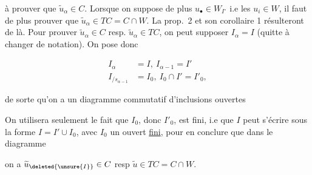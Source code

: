 
à prouver que $\widetilde u_\alpha\in C$. Lorsque on suppose de plus $u_\bullet\in W_{I^\circ}$ i.e les $u_i\in W$, il faut de plus prouver que $\widetilde u_\alpha\in TC=C\cap W$. La prop.~2 et son corollaire 1 résulteront de là. Pour prouver $\widetilde u_\alpha\in C$  resp. $\widetilde u_\alpha\in TC$, on  peut supposer $I_\alpha=I$ (quitte à changer de notation). On pose donc

\[
\begin{aligned}
 I_\alpha&=I,\ I_{\alpha-1}=I'\\
 I_{/s_{\alpha-1}}&=I_0,\ I_0\cap I'=I'_0,
\end{aligned}
\]

de sorte qu’on a un diagramme commutatif d’inclusions ouvertes


On utilisera seulement le fait que $I_0$, donc $I'_0$, est fini, i.e que  $I$ peut s’écrire sous la forme $I=I'\cup I_0$, avec $I_0$ un ouvert \uline{fini}, pour en conclure que dans le diagramme


on a $\widetilde u_{\deleted{\unsure{I}}}\in C$ resp $\widetilde u\in TC=C\cap W$.

